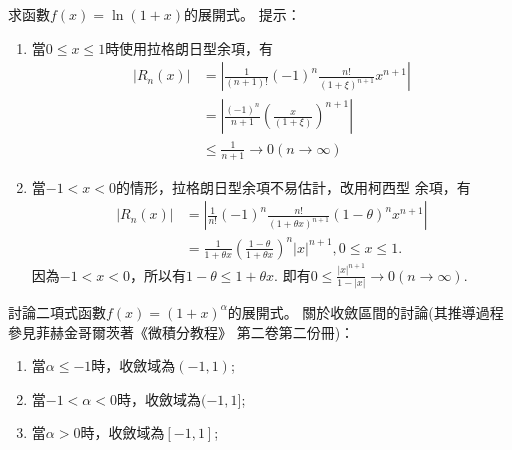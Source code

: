 \documentclass[a4paper,12pt]{article}
\theoremstyle{theorem}
\begin{document}
\begin{CJK*}{UTF8}{bsmi}
    \begin{example}
        求函數$\displaystyle f(x) = \ln (1+x)$的展開式。
        提示：
        \begin{enumerate}[label={\rm(\arabic*)}]
            \item 當$0 \le x \le 1$時使用拉格朗日型余項，有
                \[
                    \begin{split}
                        \left| R_n(x) \right| &  = 
                        \left| \frac{1}{(n+1)!}(-1)^n 
                        \frac{n!}{(1+\xi)^{n+1}}x^{n+1} \right| \\
                        & = \left|\frac{(-1)^n}{n+1}\left(\frac{x}
                        {(1+\xi)}\right)^{n+1}\right| \\
                        & \le \frac{1}{n+1} \to 0 (n \to \infty)
                    \end{split}
                \]
            \item 當$-1 < x < 0$的情形，拉格朗日型余項不易估計，改用柯西型
                余項，有
                \[
                    \begin{split}
                        \left| R_n(x) \right| & = \left| \frac{1}{n!}(-1)^n 
                        \frac{n!}{(1+\theta x)^{n+1}}(1-\theta)^n x^{n+1}
                        \right| \\
                        & = \frac{1}{1+\theta x}\left(\frac{1-\theta}
                        {1+\theta x}\right)^n\vert x \vert^{n+1}, 
                        0 \le x \le 1.
                    \end{split}
                \]
                因為$-1 < x < 0$，所以有$1 - \theta \le 1 + \theta x$.
                即有$\displaystyle 0 \le \frac{|x|^{n+1}}{1-|x|} \to 0 
                (n \to \infty)$.
        \end{enumerate}
    \end{example}
    \begin{example}
        討論二項式函數$f(x) = (1+x)^{\alpha}$的展開式。
        關於收斂區間的討論(其推導過程參見菲赫金哥爾茨著《微積分教程》
        第二卷第二份冊)：
        \begin{enumerate}[label={\rm(\arabic*)}]
            \item 當$\alpha \le -1$時，收斂域為$(-1,1)$;
            \item 當$-1 < \alpha < 0$時，收斂域為$(-1,1]$;
            \item 當$\alpha > 0$時，收斂域為$[-1, 1]$;
        \end{enumerate}
    \end{example}


\end{CJK*}
\end{document}
